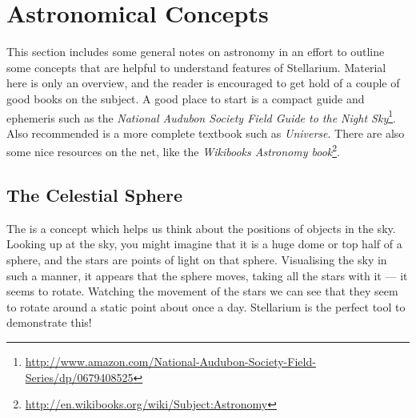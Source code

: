 
\chapter{Astronomical Concepts}
\label{ch:Concepts}

This section includes some general notes on astronomy in an effort to
outline some concepts that are helpful to understand features of
Stellarium. Material here is only an overview, and the reader is
encouraged to get hold of a couple of good books on the subject. A
good place to start is a compact guide and ephemeris such as the
\emph{National Audubon Society Field Guide to the Night
  Sky}\footnote{\url{http://www.amazon.com/National-Audubon-Society-Field-Series/dp/0679408525}}. Also
recommended is a more complete textbook such as
\emph{Universe}. %
There are also some nice resources on the net, like the
\emph{Wikibooks Astronomy
  book}\footnote{\url{http://en.wikibooks.org/wiki/Subject:Astronomy}}.

\section{The Celestial Sphere}
\label{sec:Concepts:CelestialSphere}

The  is a concept which helps us think about the
positions of objects in the sky. Looking up at the sky, you might
imagine that it is a huge dome or top half of a sphere, and the stars
are points of light on that sphere. Visualising the sky in such a
manner, it appears that the sphere moves, taking all the stars with it
--- it seems to rotate. Watching the movement of the stars we can see
that they seem to rotate around a static point about once a day.
Stellarium is the perfect tool to demonstrate this!

